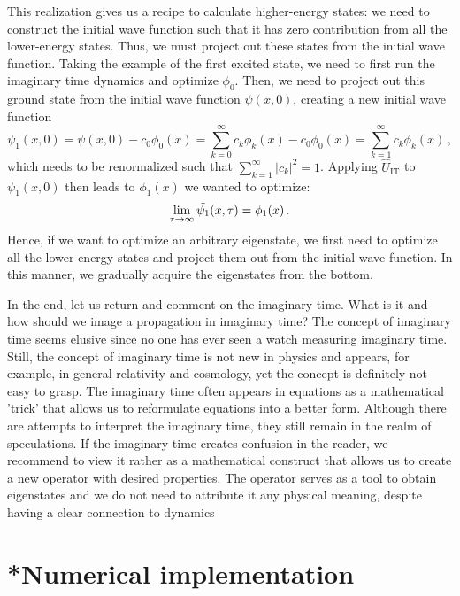 This realization gives us a recipe to calculate higher-energy states: we need to construct the initial wave function such that it has zero contribution from all the lower-energy states. Thus, we must project out these states from the initial wave function. Taking the example of the first excited state, we need to first run the imaginary time dynamics and optimize $\phi_0$. Then, we need to project out this ground state from the initial wave function $\psi(x,0)$, creating a new initial wave function
\begin{equation}
    \psi_1(x,0) = \psi(x,0) - c_0 \phi_0(x) = \sum_{k=0}^\infty c_k \phi_k(x) - c_0 \phi_0(x) = \sum_{k=1}^\infty c_k \phi_k(x) \, ,
\end{equation}
which needs to be renormalized such that $\sum_{k=1}^\infty |c_k|^2 = 1$. Applying $\hat{U}_\mathrm{IT}$ to $\psi_1(x,0)$ then leads to $\phi_1(x)$ we wanted to optimize:
\begin{equation}
    \lim_{\tau\to\infty} \Tilde{\psi_1}(x,\tau) = \phi_1(x) \, .
\end{equation}
Hence, if we want to optimize an arbitrary eigenstate, we first need to optimize all the lower-energy states and project them out from the initial wave function. In this manner, we gradually acquire the eigenstates from the bottom.

In the end, let us return and comment on the imaginary time. What is it and how should we image a propagation in imaginary time? The concept of imaginary time seems elusive since no one has ever seen a watch measuring imaginary time. Still, the concept of imaginary time is not new in physics and appears, for example, in general relativity and cosmology, yet the concept is definitely not easy to grasp. The imaginary time often appears in equations as a mathematical 'trick' that allows us to reformulate equations into a better form. Although there are attempts to interpret the imaginary time, they still remain in the realm of speculations. If the imaginary time creates confusion in the reader, we recommend to view it rather as a mathematical construct that allows us to create a new operator with desired properties. The operator serves as a tool to obtain eigenstates and we do not need to attribute it any physical meaning, despite having a clear connection to dynamics


\section{*Numerical implementation}

